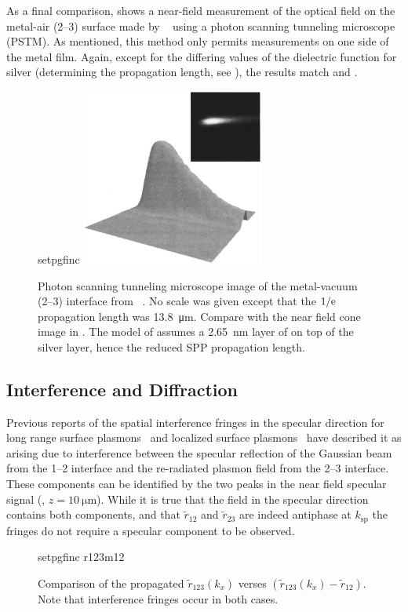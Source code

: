 As a final comparison,  shows a near-field
measurement of the optical field on the metal-air (2--3) surface made by
~\cite{dawson2001surface} using a photon scanning tunneling
microscope (PSTM).  As mentioned, this method only permits measurements on one
side of the metal film.  Again, except for the differing values of the
dielectric function for silver (determining the propagation length, see
), the results match  and 
.
\begin{figure}[ht]
\centering
{setpgfinc}
\includegraphics[keepaspectratio,width=6cm]{interference/figures/DawsonTransmitted.png}
\caption{Photon scanning tunneling microscope image of the metal-vacuum (2--3)
				interface from ~\cite{dawson2001surface}.  No scale was
				given except that the $1/{\mathrm{e}}$ propagation length was
				\SI{13.8}{\micro\meter}.  Compare with
				the near field cone image in .  The model of
				 assumes a \SI{2.65}{\nano\meter} layer of  on
				top of the silver layer, hence the reduced SPP propagation length.}
\label{fig:dawsoncompare}
\end{figure}


\subsection{Interference and Diffraction}
Previous reports of the spatial interference fringes in the specular direction
for long range surface plasmons~\cite{simon2007observation} and localized
surface plasmons~\cite{schumann2008near} have described it as arising due to
interference between the specular reflection of the Gaussian beam from the
1--2 interface and the re-radiated plasmon field from the 2--3 interface.
These components can be identified by the two peaks in the near field specular
signal (, $z=\SI{10}{\micro\meter}$).  While it is true that the field in the specular direction contains
both components, and that $\tilde{r}_{12}$ and $\tilde{r}_{23}$ are indeed
antiphase at $k_\text{sp}$ the fringes do not require a specular component to
be observed.
\begin{figure}[ht]
\centering
{setpgfinc}
{r123m12}
\caption{Comparison of the propagated $\tilde{r}_{123}(k_x)$ verses
$(\tilde{r}_{123}(k_x)-\tilde{r}_{12})$.  Note that interference fringes occur in
both cases.  }
\label{fig:r123m12}
\end{figure}

